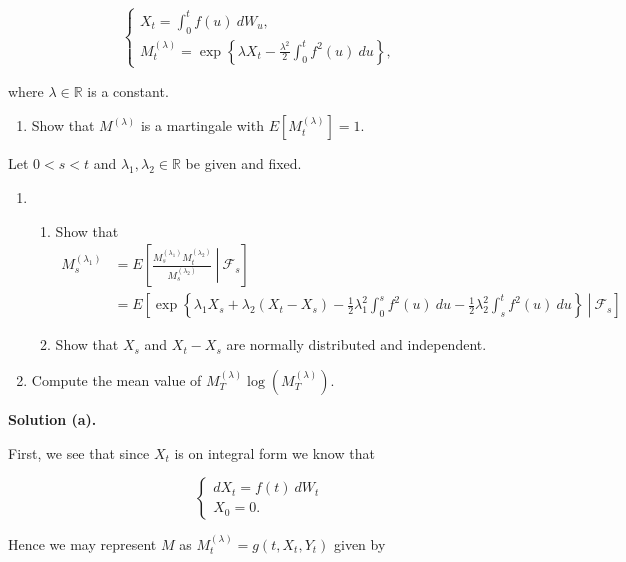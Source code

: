 \documentclass[a4paper,12pt,openany]{book}
\providecommand{\tightlist}{%
 \setlength{\itemsep}{0pt}\setlength{\parskip}{0pt}}
\begin{document}
\[
\begin{cases}
X_t=\int_0^tf(u)\ dW_u,\\
M^{(\lambda)}_t=\exp\left\{\lambda X_t-\frac{\lambda^2}{2}\int_0^t f^2(u)\ du\right\},
\end{cases}
\]

where \(\lambda\in\mathbb{R}\) is a constant.

\begin{enumerate}
\def\labelenumi{\alph{enumi}.}
\tightlist
\item
  Show that \(M^{(\lambda)}\) is a martingale with \(E[M_t^{(\lambda)}]=1\).
\end{enumerate}

Let \(0<s<t\) and \(\lambda_1,\lambda_2\in \mathbb{R}\) be given and fixed.

\begin{enumerate}
\def\labelenumi{\alph{enumi}.}
\setcounter{enumi}{1}
\item
  \begin{enumerate}
  \def\labelenumii{\roman{enumii}.}
  \tightlist
  \item
    Show that
    \begin{align*}
    M^{(\lambda_1)}_s&=E\left[\left.\frac{M^{(\lambda_1)}_sM^{(\lambda_2)}_t}{M^{(\lambda_2)}_s} \ \right\vert\ \mathcal{F}_s\right]\\
    &=E\left[\left.\exp\left\{\lambda_1X_s+\lambda_2(X_t-X_s)-\frac{1}{2}\lambda_1^2\int_0^sf^2(u)\ du- \frac{1}{2}\lambda_2^2\int_s^tf^2(u)\ du\right\} \ \right\vert\ \mathcal{F}_s\right]
    \end{align*}
  \item
    Show that \(X_s\) and \(X_t-X_s\) are normally distributed and independent.
  \end{enumerate}
\item
  Compute the mean value of \(M^{(\lambda)}_T\log(M^{(\lambda)}_T)\).
\end{enumerate}

\noindent\makebox[\linewidth]{\rule{\textwidth}{0.4pt}}

\textbf{Solution (a).}

First, we see that since \(X_t\) is on integral form we know that

\[
\begin{cases}
dX_t=f(t)\ dW_t\\
X_0=0.
\end{cases}
\]

Hence we may represent \(M\) as \(M^{(\lambda)}_t=g(t,X_t,Y_t)\) given by
\end{document}
